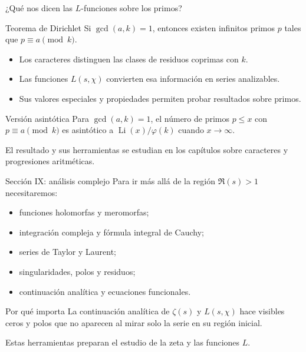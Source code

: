\documentclass[aspectratio=169,11pt]{beamer}
\begin{document}
\begin{frame}{¿Qué nos dicen las $L$-funciones sobre los primos?}
    \begin{block}{Teorema de Dirichlet}
        Si $\gcd(a,k)=1$, entonces existen infinitos primos $p$ tales que $p\equiv a\pmod k$.
    \end{block}
    \begin{itemize}
        \item Los caracteres distinguen las clases de residuos coprimas con $k$.
        \item Las funciones $L(s,\chi)$ convierten esa información en series analizables.
        \item Sus valores especiales y propiedades permiten probar resultados sobre primos.
    \end{itemize}
    \begin{exampleblock}{Versión asintótica}
        Para $\gcd(a,k)=1$, el número de primos $p\leq x$ con $p\equiv a\pmod k$ es asintótico a $\operatorname{Li}(x)/\varphi(k)$ cuando $x\to\infty$.
    \end{exampleblock}
    \centering\small El resultado y sus herramientas se estudian en los capítulos sobre caracteres y progresiones aritméticas.\;\cite[Capítulos 6 y 11]{Apostol1976-xj}
\end{frame}

\begin{frame}{Sección IX: análisis complejo}
    Para ir más allá de la región $\Re(s)>1$ necesitaremos:
    \begin{itemize}
        \item funciones holomorfas y meromorfas;
        \item integración compleja y fórmula integral de Cauchy;
        \item series de Taylor y Laurent;
        \item singularidades, polos y residuos;
        \item continuación analítica y ecuaciones funcionales.
    \end{itemize}
    \begin{block}{Por qué importa}
        La continuación analítica de $\zeta(s)$ y $L(s,\chi)$ hace visibles ceros y polos que no aparecen al mirar solo la serie en su región inicial.
    \end{block}
    \centering\small Estas herramientas preparan el estudio de la zeta y las funciones $L$.\;\cite[Capítulos 2, 4--6]{Kwok2010}
\end{frame}
\end{document}
